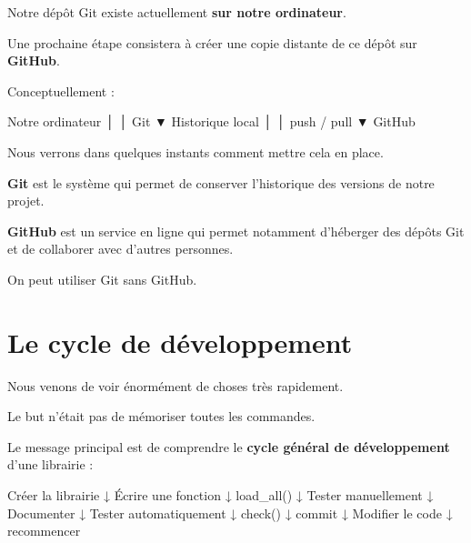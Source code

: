 \documentclass[
  letterpaper,
  DIV=11,
  numbers=noendperiod]{scrreprt}
\newenvironment{Shaded}{\begin{snugshade}}{\end{snugshade}}
\newcommand{\NormalTok}[1]{\textcolor[rgb]{0.00,0.23,0.31}{#1}}
\begin{document}
Notre dépôt Git existe actuellement \textbf{sur notre ordinateur}.

Une prochaine étape consistera à créer une copie distante de ce dépôt
sur \textbf{GitHub}.

Conceptuellement :

\begin{Shaded}
\begin{Highlighting}[]
\NormalTok{Notre ordinateur}
\NormalTok{     │}
\NormalTok{     │  Git}
\NormalTok{     ▼}
\NormalTok{Historique local}
\NormalTok{     │}
\NormalTok{     │  push / pull}
\NormalTok{     ▼}
\NormalTok{    GitHub}
\end{Highlighting}
\end{Shaded}

Nous verrons dans quelques instants comment mettre cela en place.

\begin{tcolorbox}[enhanced jigsaw, arc=.35mm, title=\textcolor{quarto-callout-warning-color}{\faExclamationTriangle}\hspace{0.5em}{Git n'est pas GitHub}, colback=white, left=2mm, rightrule=.15mm, toptitle=1mm, opacityback=0, bottomtitle=1mm, breakable, colframe=quarto-callout-warning-color-frame, coltitle=black, toprule=.15mm, titlerule=0mm, opacitybacktitle=0.6, bottomrule=.15mm, colbacktitle=quarto-callout-warning-color!10!white, leftrule=.75mm]

\textbf{Git} est le système qui permet de conserver l'historique des
versions de notre projet.

\textbf{GitHub} est un service en ligne qui permet notamment d'héberger
des dépôts Git et de collaborer avec d'autres personnes.

On peut utiliser Git sans GitHub.

\end{tcolorbox}

\section{Le cycle de développement}\label{le-cycle-de-duxe9veloppement}

Nous venons de voir énormément de choses très rapidement.

Le but n'était pas de mémoriser toutes les commandes.

Le message principal est de comprendre le \textbf{cycle général de
développement} d'une librairie :

\begin{Shaded}
\begin{Highlighting}[]
\NormalTok{Créer la librairie}
\NormalTok{        ↓}
\NormalTok{Écrire une fonction}
\NormalTok{        ↓}
\NormalTok{    load\_all()}
\NormalTok{        ↓}
\NormalTok{Tester manuellement}
\NormalTok{        ↓}
\NormalTok{Documenter}
\NormalTok{        ↓}
\NormalTok{Tester automatiquement}
\NormalTok{        ↓}
\NormalTok{     check()}
\NormalTok{        ↓}
\NormalTok{     commit}
\NormalTok{        ↓}
\NormalTok{Modifier le code}
\NormalTok{        ↓}
\NormalTok{     recommencer}
\end{Highlighting}
\end{Shaded}
\end{document}
